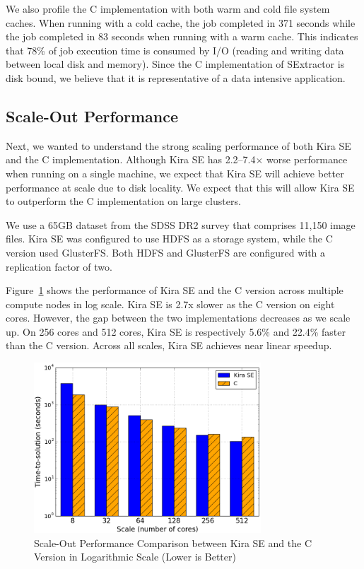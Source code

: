 \documentclass[conference]{IEEEtran}
\newcommand{\up}{\vspace*{-1em}}
\begin{document}
We also profile the C implementation with both warm and cold file system caches. When running with a
cold cache, the job completed in 371 seconds while the job completed in 83 seconds when
running with a warm cache. This indicates that 78\% of job execution time is consumed by
I/O (reading and writing data between local disk and memory). Since the C implementation of
SExtractor is disk bound, we believe that it is representative of a data intensive application. 

\subsection{Scale-Out Performance}
\label{sec:Performance-scaleout}

Next, we wanted to understand the strong scaling performance of both Kira SE and the C
implementation. Although Kira SE has 2.2--7.4$\times$ worse performance when running on
a single machine, we expect that Kira SE will achieve better performance at scale due
to disk locality. We expect that this will allow Kira SE to outperform the C implementation
on large clusters.

We use a 65GB dataset from the SDSS DR2 survey that comprises 11,150 image files.
Kira SE was configured to use HDFS as a storage system, while the C version used GlusterFS. 
Both HDFS and GlusterFS are configured with a replication factor of two.

Figure~\ref{fig:scaleout} shows the performance of Kira SE and the C version across
multiple compute nodes in log scale. Kira SE is 2.7x slower as the C version
on eight cores. However, the gap between the two implementations decreases as we scale up. 
On 256 cores and 512 cores, Kira SE is respectively 5.6\% and 22.4\% faster than the C version.
Across all scales, Kira SE achieves near linear speedup.

\begin{figure}[h]
	\begin{center}
		\includegraphics[width=85mm]{pictures/scaleout}
		\caption{Scale-Out Performance Comparison between Kira SE and the C Version in Logarithmic Scale (Lower is Better)
		\label{fig:scaleout}}
		\up\up
  	\end{center}
\end{figure}
\end{document}
